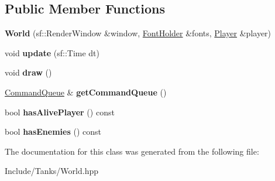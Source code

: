 \subsection*{Public Member Functions}
\begin{DoxyCompactItemize}
\item 
\hypertarget{class_world_ad8c6499a2c10fb5ad5fe4e47ddbce5ed}{}{\bfseries World} (sf\+::\+Render\+Window \&window, \hyperlink{class_resource_holder}{Font\+Holder} \&fonts, \hyperlink{class_player}{Player} \&player)\label{class_world_ad8c6499a2c10fb5ad5fe4e47ddbce5ed}

\item 
\hypertarget{class_world_ac7b3a3923c95b812ec2d00d97c8cd56e}{}void {\bfseries update} (sf\+::\+Time dt)\label{class_world_ac7b3a3923c95b812ec2d00d97c8cd56e}

\item 
\hypertarget{class_world_ab51a17ccbb108616daacd0c34973dc8d}{}void {\bfseries draw} ()\label{class_world_ab51a17ccbb108616daacd0c34973dc8d}

\item 
\hypertarget{class_world_aa950faf89ee776af031062df93c0e5ff}{}\hyperlink{class_command_queue}{Command\+Queue} \& {\bfseries get\+Command\+Queue} ()\label{class_world_aa950faf89ee776af031062df93c0e5ff}

\item 
\hypertarget{class_world_a2a3d381e8e0bbe36dfa7203ff3aaefcb}{}bool {\bfseries has\+Alive\+Player} () const \label{class_world_a2a3d381e8e0bbe36dfa7203ff3aaefcb}

\item 
\hypertarget{class_world_a42191b670dcf2ddf8779b1fcce3f4e94}{}bool {\bfseries has\+Enemies} () const \label{class_world_a42191b670dcf2ddf8779b1fcce3f4e94}

\end{DoxyCompactItemize}


The documentation for this class was generated from the following file\+:\begin{DoxyCompactItemize}
\item 
Include/\+Tanks/World.\+hpp\end{DoxyCompactItemize}
